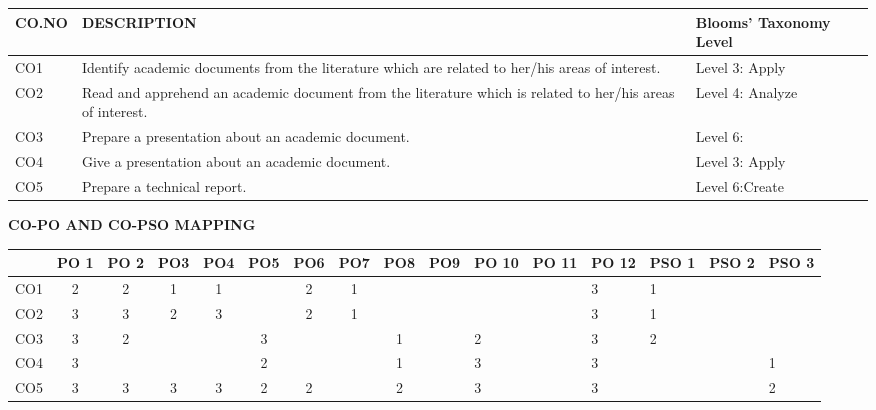 \begin{center}
    \begin{tabular}{|m{4em}|m{23em}|m{8em}|}
\hline
\textbf{CO.NO} & 
\textbf{DESCRIPTION} &
\textbf{Blooms' Taxonomy Level}\\
\hline
CO1 & Identify academic documents from the literature which are related to her/his areas of interest.
 & Level 3: Apply\\
 \hline
CO2 & Read and apprehend an academic document from the literature which is related to her/his areas of interest.& Level 4: Analyze\\
\hline
CO3 &Prepare a presentation about an academic document. & Level 6:\\
\hline 
CO4 & Give a presentation about an academic document. & Level 3: Apply\\
 \hline
CO5 & Prepare a technical report.& Level 6:Create\\
\hline
\end{tabular}
\end{center}
\vspace{5mm}
\textbf{CO-PO AND CO-PSO MAPPING}
\begin{center}
\footnotesize
    \begin{longtable}{|m{1.65em}|c|c|c|c|c|c|c|c|c|m{1.3em}|m{1.3em}|m{1.3em}|m{1.3em}|m{1.5em}|m{1.5em}|}
\hline
& PO 1 & PO 2 & PO3 & PO4 & PO5 & PO6 & PO7 & PO8 & PO9 & PO 10 & PO 11& PO 12 & PSO 1 & PSO 2 & PSO 3\\
\hline
CO1 & 2 & 2 & 1 & 1 & & 2 & 1 & & & & & 3 & 1 & &\\\hline
CO2 & 3 & 3 & 2 & 3 & & 2 & 1 & & & & & 3 & 1 & &\\\hline
CO3 & 3 & 2 & & & 3 & & & 1 & & 2 & & 3 & 2 & &\\\hline
CO4 & 3 & & & & 2 & & & 1 & & 3 & & 3 & & & 1\\\hline
CO5 & 3 & 3 & 3 & 3 & 2 & 2 & & 2 & & 3 & & 3 & & & 2\\
\hline
\end{longtable}
\end{center}